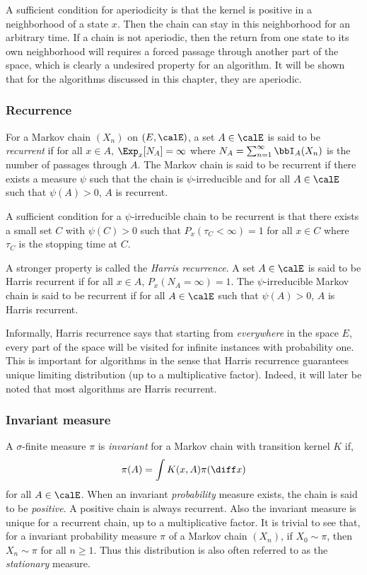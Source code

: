 A sufficient condition for aperiodicity is that the kernel is positive in a
neighborhood of a state $x$. Then the chain can stay in this neighborhood for
an arbitrary time. If a chain is not aperiodic, then the return from one state
to its own neighborhood will requires a forced passage through another part of
the space, which is clearly a undesired property for an \mcmc algorithm. It
will be shown that for the algorithms discussed in this chapter, they are
aperiodic.

\subsubsection{Recurrence}
\label{ssub:Recurrence}

For a Markov chain $(X_n)$ on $(E,\calE)$, a set $A\in\calE$ is said to be
\emph{recurrent} if for all $x\in A$, $\Exp_x[N_A] = \infty$ where $N_A =
\sum_{n=1}^{\infty}\bbI_A(X_n)$ is the number of passages through $A$. The
Markov chain is said to be recurrent if there exists a measure $\psi$ such
that the chain is $\psi$-irreducible and for all $A\in\calE$ such that
$\psi(A)>0$, $A$ is recurrent.

A sufficient condition for a $\psi$-irreducible chain to be recurrent is that
there exists a small set $C$ with $\psi(C)>0$ such that $P_x(\tau_C<\infty) =
1$ for all $x\in C$ where $\tau_C$ is the stopping time at $C$.

A stronger property is called the \emph{Harris recurrence}. A set $A\in\calE$
is said to be Harris recurrent if for all $x\in A$, $P_x(N_A = \infty) = 1$.
The $\psi$-irreducible Markov chain is said to be recurrent if for all
$A\in\calE$ such that $\psi(A)>0$, $A$ is Harris recurrent.

Informally, Harris recurrence says that starting from \emph{everywhere} in the
space $E$, every part of the space will be visited for infinite instances with
probability one. This is important for \mcmc algorithms in the sense that
Harris recurrence guarantees unique limiting distribution (up to a
multiplicative factor). Indeed, it will later be noted that most algorithms
are Harris recurrent.

\subsubsection{Invariant measure}
\label{ssub:Invariant measure}

A $\sigma$-finite measure $\pi$ is \emph{invariant} for a Markov chain with
transition kernel $K$ if,
\begin{equation}
  \pi(A) = \int K(x,A)\pi(\diff x)
\end{equation}
for all $A\in\calE$. When an invariant \emph{probability} measure exists, the
chain is said to be \emph{positive}. A positive chain is always recurrent.
Also the invariant measure is unique for a recurrent chain, up to a
multiplicative factor. It is trivial to see that, for a invariant probability
measure $\pi$ of a Markov chain $(X_n)$, if $X_0\sim\pi$, then $X_n\sim\pi$
for all $n\ge1$. Thus this distribution is also often referred to as the
\emph{stationary} measure.


